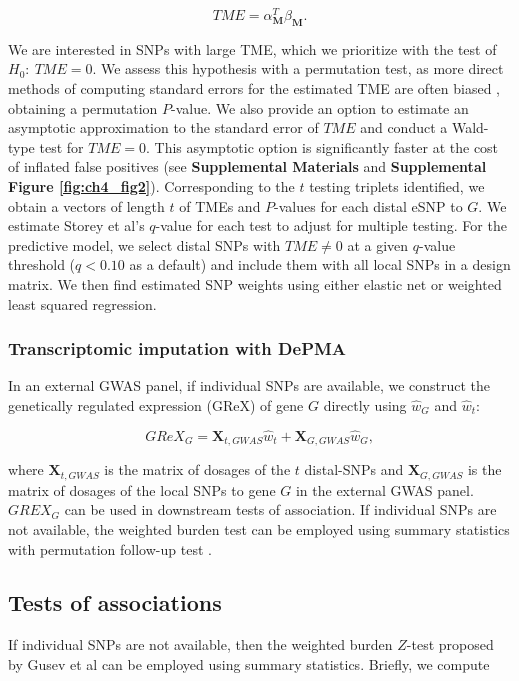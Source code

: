 $$TME = \alpha_{\mathbf{M}}^T\beta_{\mathbf{M}}.$$

\noindent We are interested in SNPs with large TME, which
we prioritize with the test of $H_0:~TME = 0$.
We assess this hypothesis with a permutation test, as
more direct methods of computing standard errors
for the estimated TME are often biased \cite{Mackinnon2004,Shan2019},
obtaining a permutation $P$-value.
We also provide an option to estimate
an asymptotic approximation to the
standard error of $TME$ 
and conduct a Wald-type test for
$TME = 0$. This asymptotic option 
is significantly faster at
the cost of inflated false positives 
(see \textbf{Supplemental Materials}
and 
\textbf{Supplemental Figure \ref{fig:ch4_fig2}}).
Corresponding to the $t$ testing triplets identified, 
we obtain a vectors of length $t$ of TMEs and $P$-values
for each distal eSNP to $G$. We estimate
Storey et al's $q$-value for each test to adjust
for multiple testing.
For the predictive model, we select distal
SNPs with $TME \neq 0$ 
at a given $q$-value threshold ($q < 0.10$
as a default)
and include them with all local SNPs in
a design matrix. We then find estimated SNP
weights using either elastic net or weighted least
squared regression.

\subsubsection{Transcriptomic imputation with DePMA}
In an external GWAS panel, if individual SNPs are 
available, we construct the genetically regulated
expression (GReX) of gene $G$
directly using $\hat{w}_G$ and $\hat{w}_t$:

$$GReX_G = \mathbf{X}_{t,GWAS}\hat{w}_{t} + 
\mathbf{X}_{G,GWAS}\hat{w}_G,$$

\noindent where $\mathbf{X}_{t,GWAS}$ is the matrix of dosages of the
$t$ distal-SNPs and $\mathbf{X}_{G,GWAS}$ is the matrix of 
dosages of the local SNPs to gene $G$ in the external GWAS
panel. $GREX_G$ can be used in downstream tests of association.
If individual SNPs are not available, the weighted
burden test can be employed using summary statistics with
permutation follow-up
test \cite{Gusev2016}.

\subsection{Tests of associations}


If individual SNPs are not available, then the weighted burden
$Z$-test proposed by Gusev et al can be employed \cite{Gusev2016} 
using
summary statistics. Briefly, we compute

